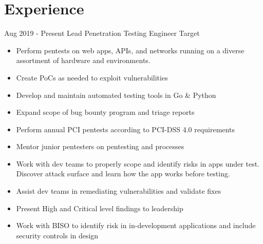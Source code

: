 \documentclass[a4paper]{twentysecondcv} %
\begin{document}
\makeprofile %

\section{Experience}

\begin{twenty} %
    \twentyitem
        {Aug 2019 -}
        {Present}
        {Lead Penetration Testing Engineer}
        {Target}
        {}
        {\begin{itemize}
            \item Perform pentests on web apps, APIs, and networks running on a diverse assortment of hardware and environments.
            \item Create PoCs as needed to exploit vulnerabilities
            \item Develop and maintain automated testing tools in Go \& Python
            \item Expand scope of bug bounty program and triage reports
            \item Perform annual PCI pentests according to PCI-DSS 4.0 requirements
            \item Mentor junior pentesters on pentesting and processes
            \item Work with dev teams to properly scope and identify risks in apps under test. Discover attack surface and learn how the app works before testing.
            \item Assist dev teams in remediating  vulnerabilities and validate fixes
            \item Present High and Critical level findings to leadership
            \item Work with BISO to identify risk in in-development applications and include security controls in design
        \end{itemize}}

\end{twenty}
\end{document}
